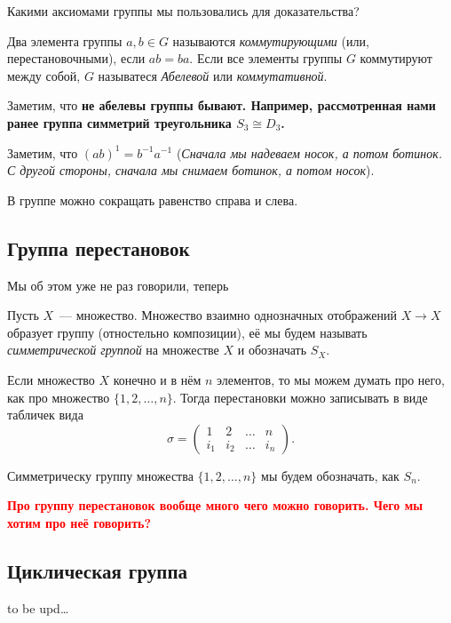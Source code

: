 	\begin{remark}
		Какими аксиомами группы мы пользовались для доказательства? 
	\end{remark}

	\begin{definition} 
		Два элемента группы $a, b \in G$ называются \emph{коммутирующими} (или, перестановочными), если $ab = ba$. Если все элементы группы $G$ коммутируют между собой, $G$ называтеся \emph{Абелевой} или \emph{коммутативной}. 
	\end{definition}

	\begin{remark}
		Заметим, что \bf{не абелевы} группы бывают. Например, рассмотренная нами ранее группа симметрий треугольника $S_{3} \cong D_{3}$.
	\end{remark}

	\begin{example}
		Заметим, что $(ab)^{1} = b^{-1}a^{-1}$ (\emph{Сначала мы надеваем носок, а потом ботинок. С другой  стороны, сначала мы снимаем ботинок, а потом носок}).
	\end{example}

	\begin{observation}
		В группе можно сокращать равенство справа и слева. 
	\end{observation}


	\subsection{Группа перестановок}

	Мы об этом уже не раз говорили, теперь 

	\begin{definition} 
		Пусть $X$~--- множество. Множество взаимно однозначных отображений $X \to X$ образует группу (отностельно композиции), её мы будем называть \emph{симметрической группой} на множестве $X$ и обозначать $S_{X}$. 
	\end{definition}

	\begin{remark}
		Если множество $X$ конечно и в нём $n$ элементов, то мы можем думать про него, как про множество $\{ 1, 2, \ldots, n \}$.  Тогда перестановки можно записывать в виде табличек вида 
		\[
			\sigma = \begin{pmatrix} 1 & 2 & \ldots & n \\ i_{1} & i_{2} & \ldots & i_{n} \end{pmatrix}.
		\]

		Симметрическу группу множества $\{ 1, 2, \ldots, n \}$ мы будем обозначать, как $S_{n}$.
	\end{remark}

	\textcolor{red}{\bf{Про группу перестановок вообще много чего можно говорить. Чего мы хотим про неё говорить?}}

	\subsection{Циклическая группа}

	to be upd\ldots






	

	




